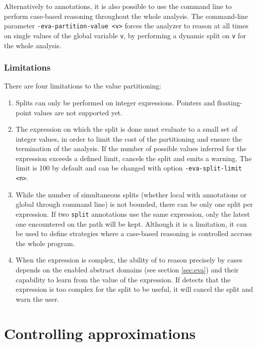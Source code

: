 \documentclass{frama-c-book}
\begin{document}
Alternatively to annotations, it is also possible to use the command line to
perform case-based reasoning throughout the whole analysis. The command-line parameter
\lstinline|-eva-partition-value <v>| forces the analyzer to reason at all times
on single values of the global variable \lstinline|v|, by performing a
dynamic split on \lstinline|v| for the whole analysis.

\subsubsection{Limitations}

There are four limitations to the value partitioning:

\begin{enumerate}
\item Splits can only be performed on integer expressions. Pointers and
  floating-point values are not supported yet.
\item The expression on which the split is done must evaluate to a small set of
  integer values, in order to limit the cost of the partitioning and ensure the
  termination of the analysis. If the number of possible values inferred for the
  expression exceeds a defined limit, \Eva{} cancels the split and emits a
  warning. The limit is 100 by default and can be changed with option
  \lstinline|-eva-split-limit <n>|.
\item While the number of simultaneous splits (whether local with annotations
  or global through command line) is not bounded, there can be only one split
  per expression. If two \lstinline|split| annotations use the same expression,
  only the latest one encountered on the path will be kept. Although it is a
  limitation, it can be used to define strategies where a case-based reasoning
  is controlled accross the whole program.
\item When the expression is complex, the ability of \Eva{} to reason
  precisely by cases depends on the enabled abstract domains (see section
  \ref{sec:eva}) and their capability to learn from the value of the expression.
  If \Eva{} detects that the expression is too complex for the split to be useful,
  it will cancel the split and warn the user.
\end{enumerate}


\section{Controlling approximations}
\label{controlling-approximations}
\end{document}
